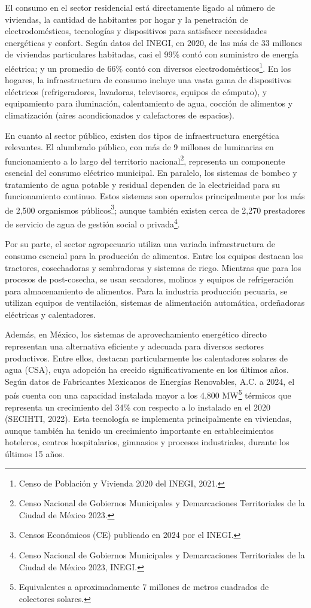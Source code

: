 \documentclass{sener2025}
\begin{document}
El consumo en el sector residencial está directamente ligado al número de viviendas, la cantidad de habitantes por hogar y la penetración de electrodomésticos, tecnologías y dispositivos para satisfacer necesidades energéticas y confort. Según datos del INEGI, en 2020, de las más de 33 millones de viviendas particulares habitadas, casi el 99\% contó con suministro de energía eléctrica; y un promedio de 66\% contó con diversos electrodomésticos\footnote{Censo de Población y Vivienda 2020 del INEGI, 2021.}. En los hogares, la infraestructura de consumo incluye una vasta gama de dispositivos eléctricos (refrigeradores, lavadoras, televisores, equipos de cómputo), y equipamiento para iluminación, calentamiento de agua, cocción de alimentos y climatización (aires acondicionados y calefactores de espacios).

En cuanto al sector público, existen dos tipos de infraestructura energética relevantes. El alumbrado público, con más de 9 millones de luminarias en funcionamiento a lo largo del territorio nacional\footnote{Censo Nacional de Gobiernos Municipales y Demarcaciones Territoriales de la Ciudad de México 2023.}, representa un componente esencial del consumo eléctrico municipal. En paralelo, los sistemas de bombeo y tratamiento de agua potable y residual dependen de la electricidad para su funcionamiento continuo. Estos sistemas son operados principalmente por los más de 2,500 organismos públicos\footnote{Censos Económicos (CE) publicado en 2024 por el INEGI.}; aunque también existen cerca de 2,270 prestadores de servicio de agua de gestión social o privada\footnote{Censo Nacional de Gobiernos Municipales y Demarcaciones Territoriales de la Ciudad de México 2023, INEGI.}.

Por su parte, el sector agropecuario utiliza una variada infraestructura de consumo esencial para la producción de alimentos. Entre los equipos destacan los tractores, cosechadoras y sembradoras y sistemas de riego. Mientras que para los procesos de post-cosecha, se usan secadores, molinos y equipos de refrigeración para almacenamiento de alimentos. Para la industria producción pecuaria, se utilizan equipos de ventilación, sistemas de alimentación automática, ordeñadoras eléctricas y calentadores.

Además, en México, los sistemas de aprovechamiento energético directo representan una alternativa eficiente y adecuada para diversos sectores productivos. Entre ellos, destacan particularmente los calentadores solares de agua (CSA), cuya adopción ha crecido significativamente en los últimos años. Según datos de Fabricantes Mexicanos de Energías Renovables, A.C. a 2024, el país cuenta con una capacidad instalada mayor a los 4,800 MW\footnote{Equivalentes a aproximadamente 7 millones de metros cuadrados de colectores solares.} térmicos que representa un crecimiento del 34\% con respecto a lo instalado en el 2020 (SECIHTI, 2022). Esta tecnología se implementa principalmente en viviendas, aunque también ha tenido un crecimiento importante en establecimientos hoteleros, centros hospitalarios, gimnasios y procesos industriales, durante los últimos 15 años.
\end{document}
